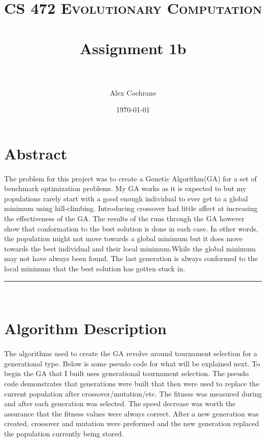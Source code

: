 \documentclass[paper=a4, fontsize=11pt]{scrartcl} %
\title{	
\normalfont \normalsize 
\textsc{CS 472 Evolutionary Computation} \\ [25pt] %
\horrule{0.5pt} \\[0.4cm] %
\huge Assignment 1b \\ %
\horrule{2pt} \\[0.5cm] %
}
\author{Alex Cochrane} %
\date{\normalsize\today} %
\numberwithin{equation}{section} %
\numberwithin{figure}{section} %
\numberwithin{table}{section} %
\newcommand{\horrule}[1]{\rule{\linewidth}{#1}} %
\begin{document}
\maketitle %


\section{Abstract}

\paragraph{} The problem for this project was to create a Genetic Algorithm(GA) for a set of benchmark optimization problems. My GA works as it is expected to but my populations rarely start with a good enough individual to ever get to a global minimum using hill-climbing. Introducing crossover had little affect at increasing the effectiveness of the GA. The results of the runs through the GA however show that conformation to the best solution is done in each case. In other words, the population might not move towards a global minimum but it does move towards the best individual and their local minimum.While the global minimum may not have always been found. The last generation is always conformed to the local minimum that the best solution has gotten stuck in.

\horrule{0.5pt} \\[0.4cm] %
\section{Algorithm Description}

\paragraph{} The algorithms used to create the GA revolve around tournament selection for a generational type. Below is some pseudo code for what will be explained next. To begin the GA that I built uses generational tournament selection. The pseudo code demonstrates that generations were built that then were used to replace the current population after crossover/mutation/etc. The fitness was measured during and after each generation was selected. The speed decrease was worth the assurance that the fitness values were always correct. After a new generation was created, crossover and mutation were preformed and the new generation replaced the population currently being stored.
\end{document}
